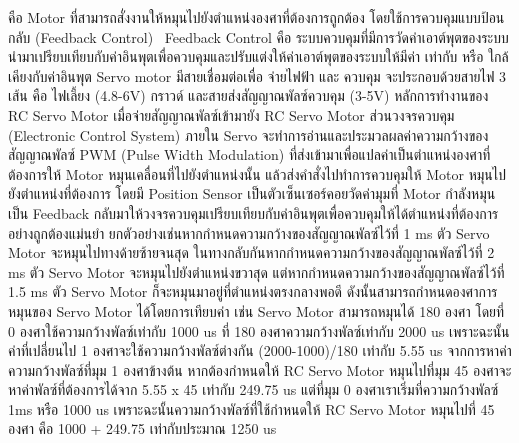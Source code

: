     คือ Motor ที่สามารถสั่งงานให้หมุนไปยังตำแหน่งองศาที่ต้องการถูกต้อง โดยใช้การควบคุมแบบป้อนกลับ (Feedback Control)  Feedback Control 
    คือ ระบบควบคุมที่มีการวัดค่าเอาต์พุตของระบบนำมาเปรียบเทียบกับค่าอินพุตเพื่อควบคุมและปรับแต่งให้ค่าเอาต์พุตของระบบให้มีค่า เท่ากับ หรือ ใกล้เคียงกับค่าอินพุต Servo motor 
    มีสายเชื่อมต่อเพื่อ จ่ายไฟฟ้า และ ควบคุม จะประกอบด้วยสายไฟ 3 เส้น คือ ไฟเลี้ยง (4.8-6V) กราวด์ และสายส่งสัญญาณพัลซ์ควบคุม (3-5V) 
    หลักการทำงานของ RC Servo Motor เมื่อจ่ายสัญญาณพัลซ์เข้ามายัง RC Servo Motor ส่วนวงจรควบคุม (Electronic Control System) ภายใน Servo 
    จะทำการอ่านและประมวลผลค่าความกว้างของสัญญาณพัลซ์ PWM (Pulse Width Modulation) ที่ส่งเข้ามาเพื่อแปลค่าเป็นตำแหน่งองศาที่ต้องการให้ Motor 
    หมุนเคลื่อนที่ไปยังตำแหน่งนั้น แล้วส่งคำสั่งไปทำการควบคุมให้ Motor หมุนไปยังตำแหน่งที่ต้องการ โดยมี Position Sensor เป็นตัวเซ็นเซอร์คอยวัดค่ามุมที่ Motor กำลังหมุน 
    เป็น Feedback กลับมาให้วงจรควบคุมเปรียบเทียบกับค่าอินพุตเพื่อควบคุมให้ได้ตำแหน่งที่ต้องการอย่างถูกต้องแม่นยำ
    ยกตัวอย่างเช่นหากกำหนดความกว้างของสัญญาณพัลซ์ไว้ที่ 1 ms ตัว Servo Motor จะหมุนไปทางด้ายซ้ายจนสุด ในทางกลับกันหากกำหนดความกว้างของสัญญาณพัลซ์ไว้ที่ 2 ms 
    ตัว Servo Motor จะหมุนไปยังตำแหน่งขวาสุด แต่หากกำหนดความกว้างของสัญญาณพัลซ์ไว้ที่ 1.5 ms ตัว Servo Motor ก็จะหมุนมาอยู่ที่ตำแหน่งตรงกลางพอดี ดังนั้นสามารถกำหนดองศาการหมุนของ Servo Motor ได้โดยการเทียบค่า 
    เช่น Servo Motor สามารถหมุนได้ 180 องศา โดยที่ 0 องศาใช้ความกว้างพัลซ์เท่ากับ 1000 us ที่ 180 องศาความกว้างพัลซ์เท่ากับ 2000 us เพราะฉะนั้นค่าที่เปลี่ยนไป 1 องศาจะใช้ความกว้างพัลซ์ต่างกัน (2000-1000)/180 เท่ากับ 5.55 us 
    จากการหาค่าความกว้างพัลซ์ที่มุม 1 องศาข้างต้น หากต้องกำหนดให้ RC Servo Motor หมุนไปที่มุม 45 องศาจะหาค่าพัลซ์ที่ต้องการได้จาก 5.55 x 45 เท่ากับ 249.75 us 
    แต่ที่มุม 0 องศาเราเริ่มที่ความกว้างพัลซ์ 1ms หรือ 1000 us เพราะฉะนั้นความกว้างพัลซ์ที่ใช้กำหนดให้ RC Servo Motor หมุนไปที่ 45 องศา คือ 1000 + 249.75 เท่ากับประมาณ 1250 us
